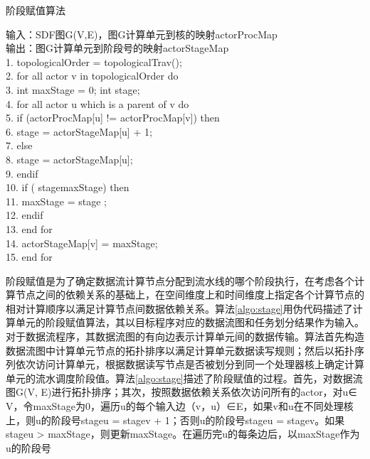 \begin{algorithm}
  \caption{阶段赋值算法}
  \label{algo:stage}
  输入：SDF图G(V,E)，图G计算单元到核的映射actorProcMap\\
  输出：图G计算单元到阶段号的映射actorStageMap\\
  1.	topologicalOrder = topologicalTrav();\\
  2.	for all actor v in topologicalOrder do\\
  3.	  \hspace*{1 pc} int maxStage = 0; int stage;\\
  4.	  \hspace*{1 pc} for all actor u which is a parent of v do\\
  5.	    \hspace*{2 pc} if (actorProcMap[u] != actorProcMap[v]) then\\
  6.	    \hspace*{3 pc}   stage = actorStageMap[u] + 1;\\
  7.	    \hspace*{2 pc} else\\
  8.	    \hspace*{3 pc}   stage = actorStageMap[u];\\
  9.	    \hspace*{2 pc} endif\\
  10.	    \hspace*{2 pc} if ( stagemaxStage) then\\
  11.	    \hspace*{3 pc}   maxStage = stage ;\\
  12.	    \hspace*{2 pc} endif\\
  13.	  \hspace*{1 pc} end for\\
  14.	  \hspace*{1 pc} actorStageMap[v] = maxStage;\\
  15.	 end for
\end{algorithm}

阶段赋值是为了确定数据流计算节点分配到流水线的哪个阶段执行，在考虑各个计算节点之间的依赖关系的基础上，在空间维度上和时间维度上指定各个计算节点的相对计算顺序以满足计算节点间数据依赖关系。算法\ref{algo:stage}用伪代码描述了计算单元的阶段赋值算法，其以目标程序对应的数据流图和任务划分结果作为输入。对于数据流程序，其数据流图的有向边表示计算单元间的数据传输。算法首先构造数据流图中计算单元节点的拓扑排序以满足计算单元数据读写规则；然后以拓扑序列依次访问计算单元，根据数据读写节点是否被划分到同一个处理器核上确定计算单元的流水调度阶段值。算法\ref{algo:stage}描述了阶段赋值的过程。首先，对数据流图G(V, E)进行拓扑排序；其次，按照数据依赖关系依次访问所有的actor，对u∈ V，令maxStage为0，遍历u的每个输入边（v，u）∈E，如果v和u在不同处理核上，则u的阶段号stageu = stagev + 1；否则u的阶段号stageu = stagev。如果stageu > maxStage，则更新maxStage。在遍历完u的每条边后，以maxStage作为u的阶段号

